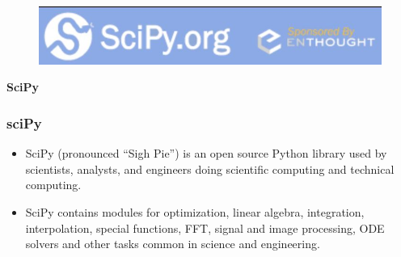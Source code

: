 \documentclass[MASTER.tex]{subfiles}
\begin{document}
	\begin{frame}
		\begin{figure}
\centering
\includegraphics[width=0.9\linewidth]{scipylogo}

\end{figure}
\huge
\textbf{SciPy}
	\end{frame}
	
	\begin{frame}
\frametitle{sciPy}
\begin{itemize}
\item SciPy (pronounced “Sigh Pie”) is an open source Python library used by scientists, analysts, and engineers doing scientific computing and technical computing.

\item SciPy contains modules for optimization, linear algebra, integration, interpolation, special functions, FFT, signal and image processing, ODE solvers and other tasks common in science and engineering.
\end{itemize}
\end{frame}
\end{document}
